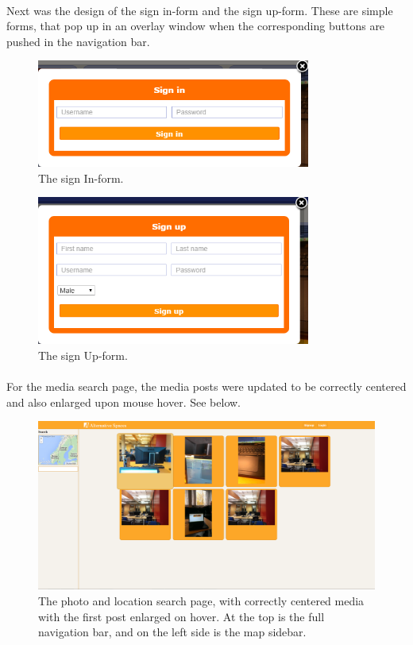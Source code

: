 \documentclass[11pt]{report}
\begin{document}
\paragraph{}
Next was the design of the sign in-form and the sign up-form. These are simple forms, that pop up in an overlay window when the corresponding buttons are pushed in the navigation bar. \\

\begin{figure}[ht!]
\centering
\includegraphics[width=90mm]{img/Sprint2-SignInForm.png}
\caption{The sign In-form. \label{overflow}}
\end{figure}

\begin{figure}[ht!]
\centering
\includegraphics[width=90mm]{img/Sprint2-SignUpForm.png}
\caption{The sign Up-form. \label{overflow}}
\end{figure}

\paragraph{} For the media search page, the media posts were updated to be correctly centered and also enlarged upon mouse hover. See below. 

\begin{figure}[ht!]
\centering
\includegraphics[width={\linewidth}]{img/Sprint2-PhotoPage.png}
\caption{The photo and location search page, with correctly centered media with the first post enlarged on hover. At the top is the full navigation bar, and on the left side is the map sidebar. \label{overflow}}
\end{figure}
\end{document}
